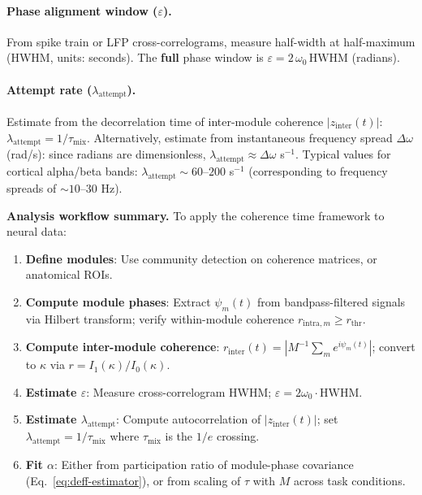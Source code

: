 \documentclass[12pt]{article}
\begin{document}
\paragraph{Phase alignment window ($\varepsilon$).} From spike train or LFP cross-correlograms, measure half-width at half-maximum (HWHM, units: seconds). The \textbf{full} phase window is $\varepsilon = 2\,\omega_0\,\mathrm{HWHM}$ (radians).

\paragraph{Attempt rate ($\lambda_{\mathrm{attempt}}$).} Estimate from the decorrelation time of inter-module coherence $|z_{\mathrm{inter}}(t)|$: $\lambda_{\mathrm{attempt}} = 1/\tau_{\mathrm{mix}}$. Alternatively, estimate from instantaneous frequency spread $\Delta\omega$ (rad/s): since radians are dimensionless, $\lambda_{\mathrm{attempt}} \approx \Delta\omega$ s$^{-1}$. Typical values for cortical alpha/beta bands: $\lambda_{\mathrm{attempt}} \sim 60$--$200$ s$^{-1}$ (corresponding to frequency spreads of $\sim 10$--$30$ Hz).

\textbf{Analysis workflow summary.} To apply the coherence time framework to neural data:
\begin{enumerate}
\item \textbf{Define modules}: Use community detection on coherence matrices, or anatomical ROIs.
\item \textbf{Compute module phases}: Extract $\psi_m(t)$ from bandpass-filtered signals via Hilbert transform; verify within-module coherence $r_{\mathrm{intra},m} \geq r_{\mathrm{thr}}$.
\item \textbf{Compute inter-module coherence}: $r_{\mathrm{inter}}(t) = |M^{-1}\sum_m e^{i\psi_m(t)}|$; convert to $\kappa$ via $r = I_1(\kappa)/I_0(\kappa)$.
\item \textbf{Estimate $\varepsilon$}: Measure cross-correlogram HWHM; $\varepsilon = 2\omega_0 \cdot \mathrm{HWHM}$.
\item \textbf{Estimate $\lambda_{\mathrm{attempt}}$}: Compute autocorrelation of $|z_{\mathrm{inter}}(t)|$; set $\lambda_{\mathrm{attempt}} = 1/\tau_{\mathrm{mix}}$ where $\tau_{\mathrm{mix}}$ is the $1/e$ crossing.
\item \textbf{Fit $\alpha$}: Either from participation ratio of module-phase covariance (Eq.~\ref{eq:deff-estimator}), or from scaling of $\tau$ with $M$ across task conditions.
\end{enumerate}
\end{document}
